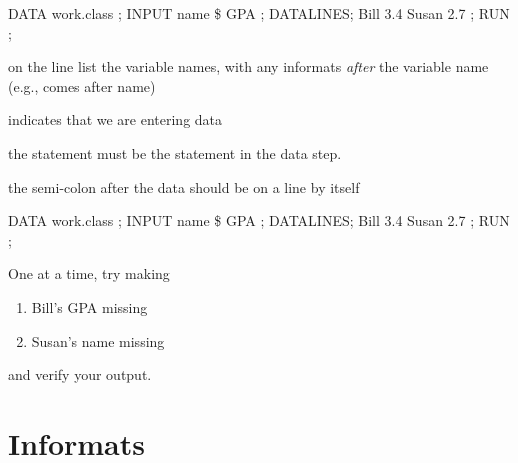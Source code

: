 \begin{frame}[fragile]
\footnotesize
\begin{code}{.0}
DATA work.class ;
  INPUT name \$ GPA ;
  DATALINES;
  Bill  3.4
  Susan 2.7
  ;
RUN ;
\end{code}
\emp
\bi
\item[]
\item on the  line list the variable names, with any informats \emph{after} the variable name (e.g., \ttt{\$} comes after name)
\item {} indicates that we are entering data
\item the  statement must be the  statement in the data step.
\item the semi-colon after the data should be on a line by itself
\ei
\end{frame}

\begin{frame}[fragile]
\footnotesize
\begin{code}{.0}
DATA work.class ;
  INPUT name \$ GPA ;
  DATALINES;
  Bill  3.4
  Susan 2.7
  ;
RUN ;
\end{code}
\emp
\vskip10pt
\oyo One at a time, try making
\begin{enumerate}
    \item Bill's GPA missing
    \item Susan's name missing
\end{enumerate}
and verify your output.
\end{frame}




\section[Informats]{Informats}
\subsection{}
\begin{frame}
\end{frame}

